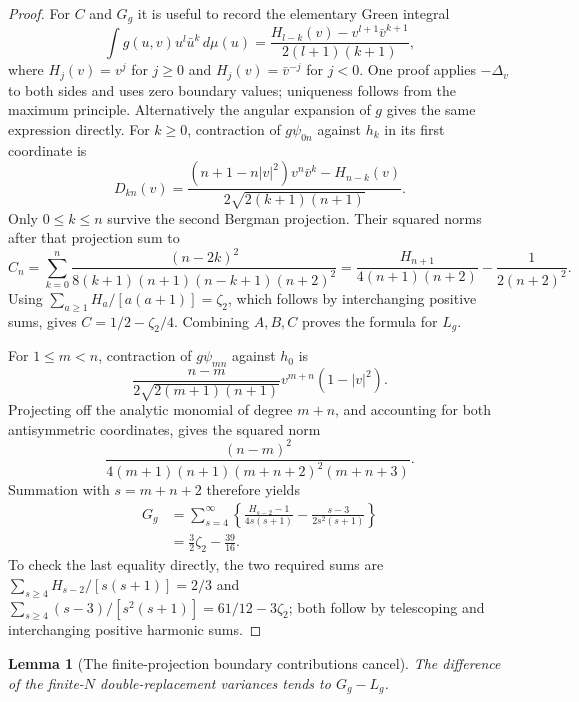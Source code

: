 \documentclass[11pt,a4paper]{article}
\numberwithin{equation}{section}
\newtheorem{lemma}[theorem]{Lemma}
\theoremstyle{definition}
\theoremstyle{remark}
\begin{document}
\begin{proof}
For $C$ and $G_g$ it is useful to record the elementary Green integral
\begin{equation}
 \int g(u,v)u^l\bar u^k\,d\mu(u)
 =\frac{H_{l-k}(v)-v^{l+1}\bar v^{k+1}}{2(l+1)(k+1)},
 \label{eq:beta2-monomial-green-integral}
\end{equation}
where $H_j(v)=v^j$ for $j\ge0$ and
$H_j(v)=\bar v^{-j}$ for $j<0$.
One proof applies $-\Delta_v$ to both sides and uses zero boundary
values; uniqueness follows from the maximum principle.  Alternatively
the angular expansion of $g$ gives the same expression directly.
For $k\ge0$, contraction of $g\psi_{0n}$ against $h_k$ in its
first coordinate is
\[
 D_{kn}(v)=\frac{(n+1-n|v|^2)v^n\bar v^k-H_{n-k}(v)}
                         {2\sqrt{2(k+1)(n+1)}}.
\]
Only $0\le k\le n$ survive the second Bergman projection.
Their squared norms after that projection sum to
\[
 C_n=\sum_{k=0}^n
 \frac{(n-2k)^2}{8(k+1)(n+1)(n-k+1)(n+2)^2}
 =\frac{H_{n+1}}{4(n+1)(n+2)}-\frac1{2(n+2)^2}.
\]
Using $\sum_{a\ge1}H_a/[a(a+1)]=\zeta_2$, which follows by
interchanging positive sums, gives $C=1/2-\zeta_2/4$.
Combining $A,B,C$ proves the formula for $L_g$.

For $1\le m<n$, contraction of $g\psi_{mn}$ against $h_0$ is
\[
 \frac{n-m}{2\sqrt{2(m+1)(n+1)}}v^{m+n}(1-|v|^2).
\]
Projecting off the analytic monomial of degree $m+n$, and accounting
for both antisymmetric coordinates, gives the squared norm
\[
 \frac{(n-m)^2}
 {4(m+1)(n+1)(m+n+2)^2(m+n+3)}.
\]
Summation with $s=m+n+2$ therefore yields
\begin{align*}
 G_g&=\sum_{s=4}^{\infty}
 \left\{\frac{H_{s-2}-1}{4s(s+1)}
                    -\frac{s-3}{2s^2(s+1)}\right\}\\
 &=\frac32\zeta_2-\frac{39}{16}.
\end{align*}
To check the last equality directly, the two required sums are
$\sum_{s\ge4}H_{s-2}/[s(s+1)]=2/3$ and
$\sum_{s\ge4}(s-3)/[s^2(s+1)]=61/12-3\zeta_2$;
both follow by telescoping and interchanging positive harmonic sums.
\end{proof}

\begin{lemma}[The finite-projection boundary contributions cancel]
\label{lem:beta2-exact-center-image}
The difference of the finite-$N$ double-replacement variances tends
to $G_g-L_g$.
\end{lemma}
\end{document}

